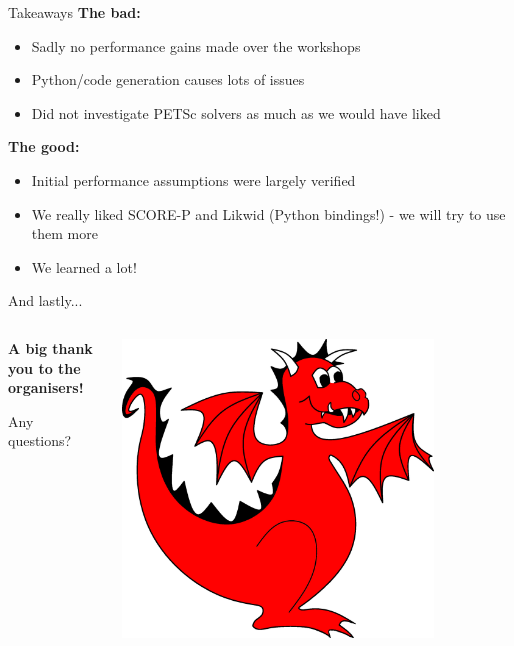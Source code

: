 \documentclass[pdf,aspectratio=169]{beamer}
\begin{document}
\begin{frame}{Takeaways}
  \textbf{The bad:}
  \begin{itemize}
    \item Sadly no performance gains made over the workshops
    \item Python/code generation causes lots of issues
    \item Did not investigate PETSc solvers as much as we would have liked
  \end{itemize}
  
  \vspace{1em}

  \textbf{The good:}
  \begin{itemize}
    \item Initial performance assumptions were largely verified
    \item We really liked SCORE-P and Likwid (Python bindings!) - we will try to use them more
    \item We learned a lot!
  \end{itemize}
\end{frame}

\begin{frame}{And lastly...}
  \begin{columns}[T]
    \begin{column}{0.45\textwidth}
      \begin{center}
	\vspace{3.5em}

	\textbf{A big thank you to the organisers!}

	\vspace{2em}

	Any questions?
      \end{center}
    \end{column}
    \begin{column}[T]{0.45\textwidth}
      \includegraphics[width=0.8\textwidth]{firedrake}
    \end{column}
  \end{columns}
\end{frame}
\end{document}
